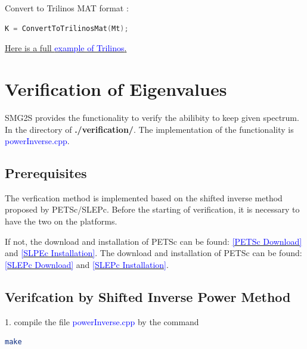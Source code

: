 \documentclass[a4paper, 10 pt]{report}
\begin{document}
	Convert to Trilinos MAT format :
	\begin{lstlisting}[language=C++,frame=single]
   K = ConvertToTrilinosMat(Mt); 
	\end{lstlisting}

	\href{https://github.com/SMG2S/SMG2S/tree/master/example/teptra}{Here is a full \textcolor{blue}{ example of Trilinos}.}
	
	\newpage

	\chapter{Verification of Eigenvalues}
	
	SMG2S provides the functionality to verify the abilibity to keep given spectrum. In the directory of \textbf{./verification/}. The implementation of the functionality is \textcolor{blue}{powerInverse.cpp}.
	
	\section{Prerequisites}
	
	The verfication method is implemented based on the shifted inverse method proposed by PETSc/SLEPc. Before the starting of verification, it is necessary to have the two on the platforms.
	
	If not, the download and installation of PETSc can be found: \href{https://www.mcs.anl.gov/petsc/download/index.html}{\textcolor{blue}{[PETSc Download]}} and \href{https://www.mcs.anl.gov/petsc/documentation/installation.html}{\textcolor{blue}{[SLPEc Installation]}}. The download and installation of PETSc can be found: \href{http://slepc.upv.es/download/}{\textcolor{blue}{[SLEPc Download]}} and \href{http://slepc.upv.es/documentation/instal.htm}{\textcolor{blue}{[SLEPc Installation]}}.
	
	\section{Verifcation by Shifted Inverse Power Method}
	
	1. compile the file \textcolor{blue}{powerInverse.cpp} by the command
	
	\begin{lstlisting}[language=bash,frame=single]
   make
	\end{lstlisting}
	
\end{document}

